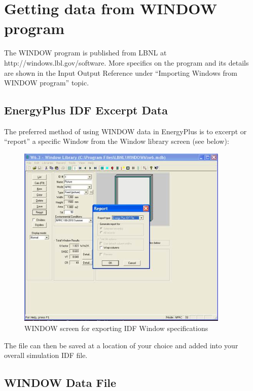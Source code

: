 \section{Getting data from WINDOW program}\label{getting-data-from-window-program}

The WINDOW program is published from LBNL at http://windows.lbl.gov/software. More specifics on the program and its details are shown in the Input Output Reference under ``Importing Windows from WINDOW program'' topic.

\subsection{EnergyPlus IDF Excerpt Data}\label{energyplus-idf-excerpt-data}

The preferred method of using WINDOW data in EnergyPlus is to excerpt or ``report'' a specific Window from the Window library screen (see below):

\begin{figure}[hbtp] %
\centering
\includegraphics[width=0.9\textwidth, height=0.9\textheight, keepaspectratio=true]{media/image001.jpg}
\caption{WINDOW screen for exporting IDF Window specifications \protect \label{fig:window-screen-for-exporting-idf-window}}
\end{figure}

The file can then be saved at a location of your choice and added into your overall simulation IDF file.

\subsection{WINDOW Data File}\label{window-data-file}

